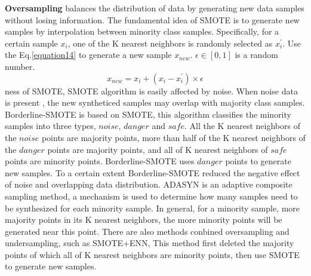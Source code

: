 \documentclass[ida]{iosart2x}
\begin{document}
\textbf{Oversampling} balances the distribution of data 
by generating new data samples without losing information.
The fundamental idea of SMOTE is to generate new samples by interpolation between minority class samples\cite{2018SMOTE}.
Specifically, for a certain sample $x_i$, one of the K nearest neighbors is randomly selected as $x_i ^{'}$.
Use the Eq.\ref{equation14} to generate a new sample $x_{new}$. $\epsilon \in [0,1]$ is a random number.
\begin{equation}
  \label{equation14}
  x_{new}=x_i+(x_i-x_i^{'})\times \epsilon
\end{equation}ness of SMOTE,
 SMOTE algorithm is easily affected by noise.
When noise data is present
, the new syntheticed samples may overlap with majority class samples.
Borderline-SMOTE\cite{2005Borderline} is based on SMOTE, this algorithm classifies
the minority samples into three types, 
$noise$, $danger$ and $safe$.
All the K nearest neighbors of the $noise$ points are majority points, 
more than half of the K nearest neighbors 
of the $danger$ points are majority points, 
and all of K nearest neighbors of $safe$ points are minority points.
Borderline-SMOTE uses $danger$ points to generate new samples.
To a certain extent Borderline-SMOTE reduced the negative effect of noise and overlapping data distribution.
ADASYN\cite{2008ADASYN} is an adaptive composite sampling method, 
a mechanism is used to determine how many samples need to be synthesized for each minority sample.
In general, for a minority sample, more majority points in its K nearest neighbors, 
the more minority points will be generated near this point.
There are also methods conbined oversampling and undersampling, such as SMOTE+ENN\cite{2019Electrocardiogram},
This method first deleted the majority points of which all of K nearest neighbors are minority points,
then use SMOTE to generate new samples.
\end{document}

